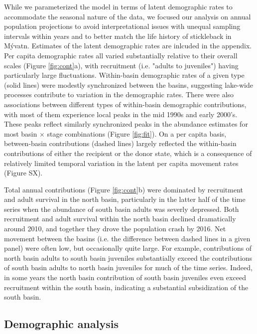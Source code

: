 While we parameterized the model in terms of latent demographic rates
to accommodate the seasonal nature of the data,
we focused our analysis on annual population projections to avoid interpretational issues
with unequal sampling intervals within years and to better match the life history of 
stickleback in M\'{y}vatn.
Estimates of the latent demographic rates are inlcuded in the appendix.
Per capita demographic rates all varied substantially relative to their overall scales
(Figure \ref{fig:cont}a),
with recruitment (i.e. "adults to juveniles") having particularly large fluctuations.
Within-basin demographic rates of a given type (solid lines) 
were modestly synchronized between the basins, 
suggesting lake-wide processes contribute to variation in the demographic rates.
There were also associations between different types 
of within-basin demographic contributions,
with most of them experience local peaks in the mid 1990s and early 2000's. 
These peaks reflect similarly synchronized peaks in the abundance estimates for 
most basin $\times$ stage combinations (Figure \ref{fig:fit}). 
On a per capita basis, 
between-basin contributions (dashed lines) largely reflected the within-basin contributions 
of either the recipient or the donor state, 
which is a consequence of relatively limited temporal variation 
in the latent per capita movement rates
(Figure SX).

Total annual contributions (Figure \ref{fig:cont}b) were dominated by recruitment 
and adult survival in the north basin, particularly in the latter half of the time
series when the abundance of south basin adults was severly depressed. 
Both recruitment and adult survival within the north basin 
declined dramatically around 2010, 
and together they drove the population crash by 2016.
Net movement between the basins (i.e. the difference between dashed lines in a given panel)
were often low, but occasionally quite large.
For example, 
contributions of north basin adults to south basin juveniles 
substantially exceed the contributions of south basin adults to north basin juveniles
for much of the time series.
Indeed, 
in some years the north basin contribution of south basin juveniles even exceed 
recruitment within the south basin, 
indicating a substantial subsidization of the south basin. 


\subsection*{Demographic analysis}

